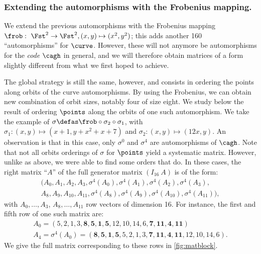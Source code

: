 
\subsubsection{Extending the automorphisms with the Frobenius mapping.} We extend the previous automorphisms with the
Frobenius mapping $\frob:~\Fst^2 \rightarrow \Fst^2,\linebreak(x, y) \mapsto (x^2,y^2)$; this adds another 160 ``automorphisms'' for $\curve$. However, these will not anymore be
automorphisms for the \emph{code} $\cagh$ in general, and we will therefore obtain matrices of a form slightly different from what we first hoped to achieve.

The global strategy is still the same, however, and consists in ordering the points along orbits of the curve automorphisms.
By using the Frobenius, we can obtain new combination of orbit sizes, notably four of size eight.
We study below the result of ordering $\points$
along the orbits of one such automorphism. We take the example of $\sigma \defas \frob \circ \sigma_2 \circ \sigma_1$, with
$\sigma_1 : (x,y) \mapsto (x + 1, y + x^2 + x + 7)$ and
$\sigma_2 : (x,y) \mapsto (12x, y)$. An observation is that in this case, only $\sigma^0$ and $\sigma^4$ are automorphisms of $\cagh$.
Note that not all orbits orderings of $\sigma$ for $\points$ yield a systematic matrix. However, unlike as above, we were able to find some orders
that do. In these cases, the right matrix ``$A$'' of the full generator matrix $(I_{16}~A)$ is of the form:
\[
\begin{aligned}
(A_0, A_1, A_2, A_3, \sigma^4(A_0), \sigma^4(A_1), \sigma^4(A_2), \sigma^4(A_3),\\
A_8, A_9, A_{10}, A_{11}, \sigma^4(A_8), \sigma^4(A_9), \sigma^4(A_{10}), \sigma^4(A_{11})),
\end{aligned}
\]
with $A_0,\ldots, A_3$, $A_8,\ldots, A_{11}$ row vectors of dimension 16. For instance, the first and fifth row of one such matrix are:
\[
	\begin{aligned}
	A_0 =(5, 2, 1, 3, \mathbf{8, 5, 1, 5}, 12, 10, 14, 6, \mathbf{7, 11, 4, 11})\\
	A_4 = \sigma^4(A_0) = (\mathbf{8, 5, 1, 5}, 5, 2, 1, 3, \mathbf{7, 11, 4, 11}, 12, 10, 14, 6).
	\end{aligned}
\]
We give the full matrix corresponding to these rows in \autoref{fig:matblock}.

